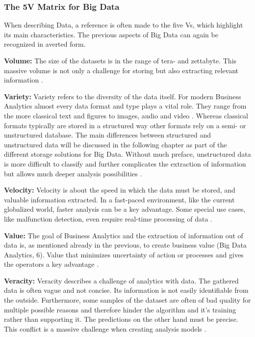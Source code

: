 \subsubsection{The 5V Matrix for Big Data}
When describing Data, a reference is often made to the five Vs,
which highlight its main characteristics.
The previous aspects of Big Data can again be recognized in averted form. 

\textbf{Volume:} The size of the datasets is in the range of tera- and zettabyte. 
This massive volume is not only a challenge for storing but also extracting
relevant information \cite[p.6]{Meier_2021}. 

\textbf{Variety:} Variety refers to the diversity of the data itself. For modern Business 
Analytics almost every data format and type plays a vital role. They range from the more classical 
text and figures to images, audio and video \cite[p.6]{Meier_2021}. Whereas classical formats 
typically are stored in a structured way other formats rely on a semi- or unstructured database. 
The main differences between structured and unstructured data will be discussed in the following 
chapter as part of the different storage solutions for Big Data. Without much preface, 
unstructured data is more difficult to classify and further complicates the extraction of 
information but allows much deeper analysis possibilities \cite[p.2f]{Tanwar2015}.

\textbf{Velocity:} Velocity is about the speed in which the data must be stored, 
and valuable information extracted. In a fast-paced environment, like the current globalized world, 
faster analysis can be a key advantage. Some special use cases, like malfunction detection, even 
require real-time processing of data \cite[p.6]{Fasel_2016}. 

\textbf{Value:} The goal of Business Analytics and the extraction of information out of data is, 
as mentioned already in the previous, to create business value (Big Data Analytics, 6). Value 
that minimizes uncertainty of action or processes and gives the operators a key advantage \cite[p.6]{Meier_2021}. 

\textbf{Veracity:} Veracity describes a challenge of analytics with data. The gathered data is 
often vague and not concise. Its information is not easily identifiable from the outside. 
Furthermore, some samples of the dataset are often of bad quality for multiple possible reasons 
and therefore hinder the algorithm and it’s training rather than supporting it. The predictions 
on the other hand must be precise. This conflict is a massive challenge when creating analysis 
models \cite[p.6]{Fasel_2016}.

